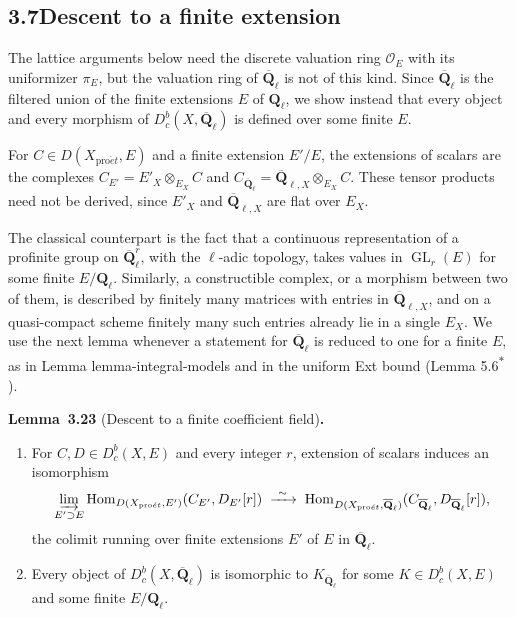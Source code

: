 \documentclass[11pt]{article}
\newenvironment{bpstatement}[2]{\par\addvspace{0.6\baselineskip}\noindent\textbf{#1}#2\textbf{.}\enspace\ignorespaces}
  {\par\addvspace{0.4\baselineskip}}
\newenvironment{bpstatementit}[2]{\begin{bpstatement}{#1}{#2}\itshape\ignorespaces}{\end{bpstatement}}
\newcommand{\bpout}[1]{#1\textsuperscript{\hyperlink{bp-outside}{\ensuremath{\ast}}}}
\providecommand{\Dbc}{}\renewcommand{\Dbc}{D^b_c}
\providecommand{\GL}{}\renewcommand{\GL}{\operatorname{GL}}
\providecommand{\Hom}{}\renewcommand{\Hom}{\operatorname{Hom}}
\providecommand{\QbarX}{}\renewcommand{\QbarX}{\overline{\mathbf Q}_{\ell,X}}
\begin{document}
\subsection*{\texorpdfstring{3.7\quad Descent to a finite extension}{3.7 Descent to a finite extension}}
\label{bp71}%
\label{bp72}%
The lattice arguments below need the discrete valuation ring \(\mathcal O_E\) with its uniformizer \(\pi_E\), but the valuation ring of \(\overline{\mathbf Q}_\ell\) is not of this kind. Since \(\overline{\mathbf Q}_\ell\) is the filtered union of the finite extensions \(E\) of \(\mathbf Q_\ell\), we show instead that every object and every morphism of \(\Dbc(X,\overline{\mathbf Q}_\ell)\) is defined over some finite \(E\).

For \(C\in D(X_{\mathrm{pro}\acute{e}t},E)\) and a finite extension \(E'/E\), the extensions of scalars are the complexes \(C_{E'}=E'_X\otimes_{E_X}C\) and \(C_{\overline{\mathbf Q}_\ell}=\QbarX\otimes_{E_X}C\). These tensor products need not be derived, since \(E'_X\) and \(\QbarX\) are flat over \(E_X\).

The classical counterpart is the fact that a continuous representation of a profinite group on \(\overline{\mathbf Q}_\ell^r\), with the \(\ell\)-adic topology, takes values in \(\GL_r(E)\) for some finite \(E/\mathbf Q_\ell\). Similarly, a constructible complex, or a morphism between two of them, is described by finitely many matrices with entries in \(\QbarX\), and on a quasi-compact scheme finitely many such entries already lie in a single \(E_X\). We use the next lemma whenever a statement for \(\overline{\mathbf Q}_\ell\) is reduced to one for a finite \(E\), as in Lemma lemma-integral-models and in the uniform Ext bound (Lemma \bpout{5.6}).

\label{bp73}%
\begin{bpstatementit}{Lemma~3.23}{ (Descent to a finite coefficient field)}
\begin{enumerate}
\item For \(C,D\in\Dbc(X,E)\) and every integer \(r\), extension of scalars induces an isomorphism \[
   \varinjlim_{E'\supset E}
   \Hom_{D(X_{\mathrm{pro}\acute{e}t},E')}(C_{E'},D_{E'}[r])
   \;\xrightarrow{\ \sim\ }\;
   \Hom_{D(X_{\mathrm{pro}\acute{e}t},\overline{\mathbf Q}_\ell)}(C_{\overline{\mathbf Q}_\ell},D_{\overline{\mathbf Q}_\ell}[r]),
   \] the colimit running over finite extensions \(E'\) of \(E\) in \(\overline{\mathbf Q}_\ell\).
\item Every object of \(\Dbc(X,\overline{\mathbf Q}_\ell)\) is isomorphic to \(K_{\overline{\mathbf Q}_\ell}\) for some \(K\in\Dbc(X,E)\) and some finite \(E/\mathbf Q_\ell\).
\end{enumerate}
\end{bpstatementit}
\end{document}
